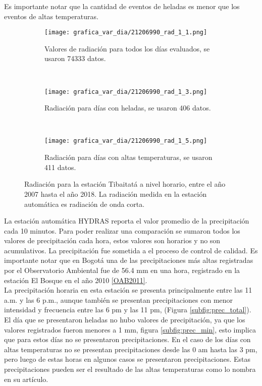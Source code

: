 Es importante notar que la cantidad de eventos de heladas es menor que los eventos de altas temperaturas. \\

\begin{figure}[H]
    \centering
    \begin{subfigure}[b]{0.45\textwidth}
    \caption{Valores de radiación para todos los días evaluados, se usaron 74333 datos.}
	\texttt{[image: grafica\_var\_dia/21206990\_rad\_1\_1.png]}
    \label{subfig:rad_total}
	\end{subfigure}
	~
    \begin{subfigure}[b]{0.45\textwidth}
    \caption{Radiación para días con heladas, se usaron 406 datos.}
	\texttt{[image: grafica\_var\_dia/21206990\_rad\_1\_3.png]}
    \label{subfig:rad_min}
	\end{subfigure}
		~
    \begin{subfigure}[b]{0.45\textwidth}
    \caption{Radiación para días con altas temperaturas, se usaron 411 datos.}
	\texttt{[image: grafica\_var\_dia/21206990\_rad\_1\_5.png]}
    \label{subfig:rad_max}
	\end{subfigure}
	
	\caption{Radiación para la estación Tibaitatá a nivel horario, entre el año 2007 hasta el año 2018. La radiación medida en la estación automática es radiación de onda corta.}
    \label{fig:rad_tibaitata}
\end{figure}


La estación automática HYDRAS reporta el valor promedio de la precipitación cada 10 minutos. Para poder realizar una comparación se sumaron todos los valores de precipitación cada hora, estos valores son horarios y no son acumulativos. La precipitación fue sometida a el proceso de control de calidad. Es importante notar que en Bogotá una de las precipitaciones más altas registradas por el Observatorio Ambiental fue de 56.4 mm en una hora, registrado en la estación El Bosque en el año 2010 \ref{OAB2011}.\\

La precipitación horaria en esta estación se presenta principalmente entre las 11 a.m. y las 6 p.m., aunque también se presentan precipitaciones con menor intensidad y frecuencia entre las 6 pm y las 11 pm, (Figura \ref{subfig:prec_total}). El día que se presentaron heladas no hubo valores de precipitación, ya que los valores registrados fueron menores a 1 mm, figura \ref{subfig:prec_min}, esto implica que para estos días no se presentaron precipitaciones. En el caso de los días con altas temperaturas no se presentan precipitaciones desde las 0 am hasta las 3 pm, pero luego de estas horas en algunos casos se presentaron precipitaciones. Estas precipitaciones pueden ser el resultado de las altas temperaturas como lo nombra \citet{Fischer2015} en su artículo.

